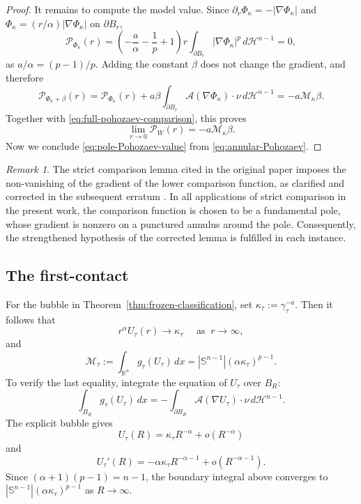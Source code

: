 \documentclass[reqno,12pt]{amsart}
\numberwithin{equation}{section}
\theoremstyle{remark}
\newtheorem{rem}[thm]{Remark}
\newcommand{\R}{\mathbb R}
\newcommand{\dd}{\,d}
\newcommand{\Acal}{\mathcal A}
\newcommand{\Pscr}{\mathscr P}
\begin{document}
\begin{proof}
It remains to compute the model value.  Since
$\partial_\nu\Phi_\kappa=-|\nabla\Phi_\kappa|$ and
$\Phi_\kappa=(r/\alpha)|\nabla\Phi_\kappa|$ on $\partial B_r$,
$$
\Pscr_{\Phi_\kappa}(r) =\left(-\frac a\alpha-\frac1p+1\right) r\int_{\partial B_r}|\nabla\Phi_\kappa|^p\dd \mathcal H^{n-1} =0,
$$
as $a/\alpha=(p-1)/p$.  Adding the constant $\beta$ does not
change the gradient, and therefore
$$
\Pscr_{\Phi_\kappa+\beta}(r) = \Pscr_{\Phi_\kappa}(r)
+a\beta\int_{\partial B_r}\Acal(\nabla\Phi_\kappa)\cdot\nu\dd \mathcal H^{n-1} =-a\mathcal M_\kappa\beta.
$$
Together with \eqref{eq:full-pohozaev-comparison}, this proves
$$
\lim_{r\to 0}\Pscr_W(r) =-a\mathcal M_\kappa\beta.
$$
Now we conclude \eqref{eq:pole-Pohozaev-value} from \eqref{eq:annular-Pohozaev}.
\end{proof}

\begin{rem}\label{rem:KV-erratum}
The strict comparison lemma cited in the original paper \cite{KV1986} imposes the non-vanishing of the gradient of the lower comparison function, as clarified and corrected in the subsequent erratum \cite[Page 352]{KV1987}. In all applications of strict comparison in the present work, the comparison function is chosen to be a fundamental pole, whose gradient is nonzero on a punctured annulus around the pole. Consequently, the strengthened hypothesis of the corrected lemma is fulfilled in each instance.
\end{rem}

\subsection{The first-contact}\label{sec:first-contact}

For the bubble in Theorem~\ref{thm:frozen-classification}, set
$\kappa_\tau:=\gamma_\tau^{-a}.$
Then it follows that
\begin{equation}\label{eq:bubble-tail}
r^\alpha U_\tau(r)\to \kappa_\tau
\quad \text{ as } \ r\to\infty,
\end{equation}
and
\begin{equation}\label{eq:bubble-source-mass}
 \mathcal M_\tau :=\int_{\R^n}g_\tau(U_\tau)\dd x
 =|\mathbb S^{n-1}|(\alpha\kappa_\tau)^{p-1}.
\end{equation}
To verify the last equality, integrate the equation of $U_\tau$ over $B_R$:
$$
 \int_{B_R}g_\tau(U_\tau)\dd x  =-\int_{\partial B_R}\Acal(\nabla U_\tau)\cdot\nu\dd \mathcal H^{n-1}.
$$
The explicit bubble gives
\begin{equation}\label{eq:estimate-U}
U_\tau(R)=\kappa_\tau R^{-\alpha}+o(R^{-\alpha})
\end{equation}
and
$$U_\tau'(R)=-\alpha\kappa_\tau R^{-\alpha-1}+o(R^{-\alpha-1}).$$
Since $(\alpha+1)(p-1)=n-1$, the boundary integral above converges to $|\mathbb S^{n-1}|(\alpha\kappa_\tau)^{p-1}$ as $R\to \infty$.
\end{document}

